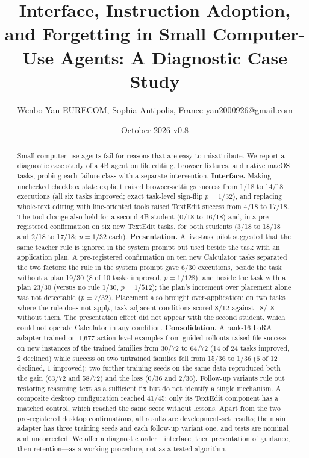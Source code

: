 \documentclass[
  10pt,
]{article}
\title{Interface, Instruction Adoption, and Forgetting in Small
Computer-Use Agents: A Diagnostic Case Study}
\author{Wenbo Yan \textperiodcentered{} EURECOM, Sophia Antipolis, France \textperiodcentered{}
yan2000926@gmail.com}
\date{October 2026 \textperiodcentered{} v0.8}
\begin{document}
\maketitle
\begin{abstract}
Small computer-use agents fail for reasons that are easy to
misattribute. We report a diagnostic case study of a 4B agent on file
editing, browser fixtures, and native macOS tasks, probing each failure
class with a separate intervention. \textbf{Interface.} Making unchecked
checkbox state explicit raised browser-settings success from 1/18 to
14/18 executions (all six tasks improved; exact task-level sign-flip
\(p=1/32\)), and replacing whole-text editing with line-oriented tools
raised TextEdit success from 4/18 to 17/18. The tool change also held
for a second 4B student (0/18 to 16/18) and, in a pre-registered
confirmation on six new TextEdit tasks, for both students (3/18 to 18/18
and 2/18 to 17/18; \(p=1/32\) each). \textbf{Presentation.} A five-task
pilot suggested that the same teacher rule is ignored in the system
prompt but used beside the task with an application plan. A
pre-registered confirmation on ten new Calculator tasks separated the
two factors: the rule in the system prompt gave 6/30 executions, beside
the task without a plan 19/30 (8 of 10 tasks improved, \(p=1/128\)), and
beside the task with a plan 23/30 (versus no rule 1/30, \(p=1/512\));
the plan's increment over placement alone was not detectable
(\(p=7/32\)). Placement also brought over-application: on two tasks
where the rule does not apply, task-adjacent conditions scored 8/12
against 18/18 without them. The presentation effect did not appear with
the second student, which could not operate Calculator in any condition.
\textbf{Consolidation.} A rank-16 LoRA adapter trained on 1,677
action-level examples from guided rollouts raised file success on new
instances of the trained families from 30/72 to 64/72 (14 of 24 tasks
improved, 2 declined) while success on two untrained families fell from
15/36 to 1/36 (6 of 12 declined, 1 improved); two further training seeds
on the same data reproduced both the gain (63/72 and 58/72) and the loss
(0/36 and 2/36). Follow-up variants rule out restoring reasoning text as
a sufficient fix but do not identify a single mechanism. A composite
desktop configuration reached 41/45; only its TextEdit component has a
matched control, which reached the same score without lessons. Apart
from the two pre-registered desktop confirmations, all results are
development-set results; the main adapter has three training seeds and
each follow-up variant one, and tests are nominal and uncorrected. We
offer a diagnostic order---interface, then presentation of guidance,
then retention---as a working procedure, not as a tested algorithm.
\end{abstract}
\end{document}
